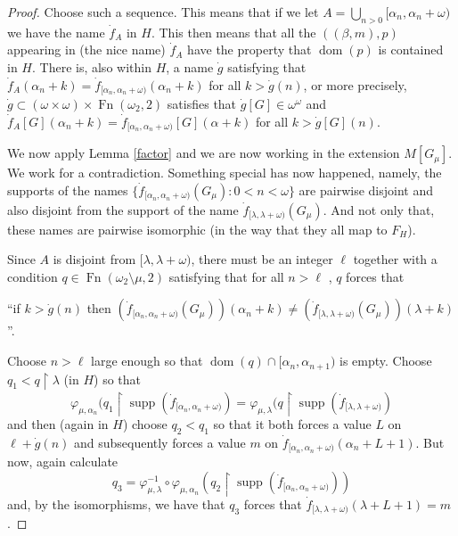 \documentclass{amsart}
\theoremstyle{plain}
\theoremstyle{definition}
\theoremstyle{remark}
\theoremstyle{plain}
\theoremstyle{definition}
\theoremstyle{remark}
\begin{document}
\begin{proof}
            Choose such a sequence.
             This means that if we let $A = \bigcup_{n>0} [\alpha_n,\alpha_n+\omega)$ we
             have the name $\dot f_A$ in $H$. This then means that all
             the $( (\beta,m) , p)$ appearing in (the nice name)
            $\dot f_A$ have the property
             that $\mathop{dom}(p)$ is contained in $H$.
            There is, also within $H$, a name $\dot g$ satisfying that
             $\dot f_A(\alpha_n+k) = \dot f_{[\alpha_n,\alpha_n+\omega)}(\alpha_n+k)$
            for all $k >\dot g(n)$,
            or more precisely,
             $\dot g\subset (\omega\times\omega) \times
             \operatorname{Fn}(\omega_2,2)$ satisfies that
             $\dot g[G]\in \omega^\omega$ and
              $\dot f_{A}[G](\alpha_n+k) = \dot
              f_{[\alpha_n,\alpha_n+\omega)}[G](\alpha+k)$
            for all $k>\dot g[G](n)$.




            We now apply  Lemma \ref{factor} and we are now
            working in the extension $M[G_\mu]$.
            We work for a contradiction. Something special has now happened,
             namely,  the supports of the names $\{
            \dot f_{[\alpha_n, \alpha_n+\omega)} (G_\mu):  0< n<\omega\}$ are pairwise disjoint
            and also disjoint from the support of the name
             $\dot f_{[\lambda,\lambda+\omega)}(G_\mu)$.
             And not only that, these names are pairwise isomorphic (in
             the way that they all map to $F_H$).






             Since $A$ is disjoint from $[\lambda,\lambda+\omega)$,
            there must be an integer $\ell$
            together with a condition
             $q\in \mathop{Fn}(\omega_2\setminus \mu,2)$ satisfying that for all
             $n>\ell$ , $q$ forces that

            \centerline{
             ``if $k>\dot g(n)$ then
             $(\dot f_{[\alpha_n,\alpha_n+\omega)}(G_\mu))(\alpha_n+k) \neq
            (\dot f_{[\lambda,\lambda+\omega)}(G_\mu))(\lambda +k)$''.}

            Choose $n>\ell$ large enough so that $\mathop{dom}(q) \cap [\alpha_n,
            \alpha_{n+1})$ is
            empty.
             Choose $q_1<q\restriction \lambda$ (in $H$) so that
            $$ \varphi_{\mu,\alpha_n}(q_1\restriction \operatorname{supp}(
             \dot f_{[\alpha_n,\alpha_n+\omega)}) =
            \varphi_{\mu,\lambda}(q\restriction \operatorname{supp}(
             \dot f_{[\lambda,\lambda+\omega)}) $$
            and then (again in $H$) choose $q_2 < q_1$
            so that it both forces a value
             $L$ on $\ell+\dot g(n)$
            and subsequently forces a value $m$ on
             $\dot f_{[\alpha_n, \alpha_n+\omega)}(\alpha_n+L+1)$.
            But now, again calculate
            $$ q_3 = \varphi_{\mu,\lambda}^{-1} \circ \varphi_{\mu,\alpha_n}
            (q_2\restriction \operatorname{supp}(\dot
            f_{[\alpha_n,\alpha_n+\omega)}))$$
            and, by the isomorphisms, we have that $q_3$ forces that
             $\dot f_{[\lambda,\lambda+\omega)}(\lambda+L+1) = m$.


\end{proof}
\end{document}
